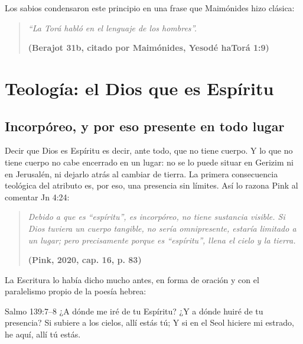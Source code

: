 Los sabios condensaron este principio en una frase que Maimónides hizo clásica:

\begin{quote}\itshape
``La Torá habló en el lenguaje de los hombres''.\par\hfill{\upshape\small\bfseries\textcolor{azul}{(Berajot 31b, citado por Maimónides, Yesodé haTorá 1:9)}}
\end{quote}


\section{Teología: el Dios que es Espíritu}

\subsection{Incorpóreo, y por eso presente en todo lugar}

Decir que Dios es Espíritu es decir, ante todo, que no tiene cuerpo. Y lo que no tiene cuerpo no cabe encerrado en un lugar: no se lo puede situar en Gerizim ni en Jerusalén, ni dejarlo atrás al cambiar de tierra. La primera consecuencia teológica del atributo es, por eso, una presencia sin límites. Así lo razona Pink al comentar Jn 4:24:

\begin{quote}\itshape
Debido a que es ``espíritu'', es incorpóreo, no tiene sustancia visible. Si Dios tuviera un cuerpo tangible, no sería omnipresente, estaría limitado a un lugar; pero precisamente porque es ``espíritu'', llena el cielo y la tierra.\par\hfill{\upshape\small\bfseries\textcolor{azul}{(Pink, 2020, cap. 16, p. 83)}}
\end{quote}

La Escritura lo había dicho mucho antes, en forma de oración y con el paralelismo propio de la poesía hebrea:

\begin{verso}{Salmo 139:7–8}
¿A dónde me iré de tu Espíritu? ¿Y a dónde huiré de tu presencia? Si subiere a los cielos, allí estás tú; Y si en el Seol hiciere mi estrado, he aquí, allí tú estás.
\end{verso}

